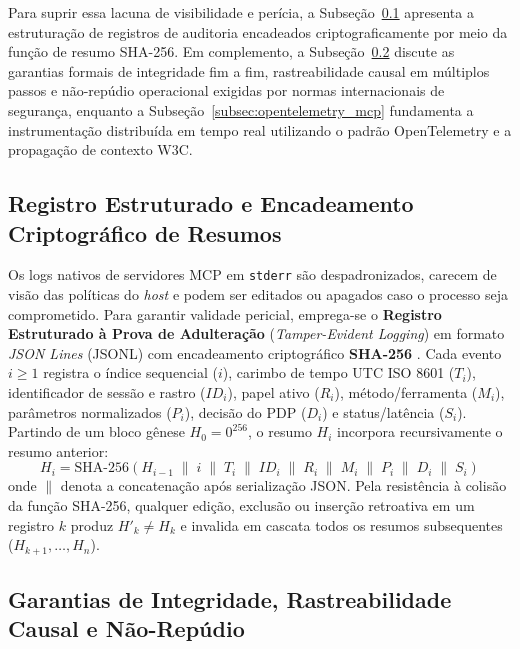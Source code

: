 Para suprir essa lacuna de visibilidade e perícia, a Subseção~\ref{subsec:hash_chaining} apresenta a estruturação de registros de auditoria encadeados criptograficamente por meio da função de resumo SHA-256. Em complemento, a Subseção~\ref{subsec:integridade_naorepudio} discute as garantias formais de integridade fim a fim, rastreabilidade causal em múltiplos passos e não-repúdio operacional exigidas por normas internacionais de segurança, enquanto a Subseção~\ref{subsec:opentelemetry_mcp} fundamenta a instrumentação distribuída em tempo real utilizando o padrão OpenTelemetry e a propagação de contexto W3C.

\subsection{Registro Estruturado e Encadeamento Criptográfico de Resumos}
\label{subsec:hash_chaining}

Os logs nativos de servidores MCP em \texttt{stderr} são despadronizados, carecem de visão das políticas do \textit{host} e podem ser editados ou apagados caso o processo seja comprometido. Para garantir validade pericial, emprega-se o \textbf{Registro Estruturado à Prova de Adulteração} (\textit{Tamper-Evident Logging}) em formato \textit{JSON Lines} (JSONL) com encadeamento criptográfico \textbf{SHA-256} \cite{jang2026hierarchical}. Cada evento $i \ge 1$ registra o índice sequencial ($i$), carimbo de tempo UTC ISO 8601 ($T_i$), identificador de sessão e rastro ($ID_i$), papel ativo ($R_i$), método/ferramenta ($M_i$), parâmetros normalizados ($P_i$), decisão do PDP ($D_i$) e status/latência ($S_i$). Partindo de um bloco gênese $H_0 = 0^{256}$, o resumo $H_i$ incorpora recursivamente o resumo anterior:
\begin{equation}
  H_i = \text{SHA-256}\left( H_{i-1} \;\|\; i \;\|\; T_i \;\|\; ID_i \;\|\; R_i \;\|\; M_i \;\|\; P_i \;\|\; D_i \;\|\; S_i \right)
  \label{eq:hash_chain}
\end{equation}
onde $\|$ denota a concatenação após serialização JSON. Pela resistência à colisão da função SHA-256, qualquer edição, exclusão ou inserção retroativa em um registro $k$ produz $H'_k \neq H_k$ e invalida em cascata todos os resumos subsequentes ($H_{k+1}, \dots, H_n$).

\subsection{Garantias de Integridade, Rastreabilidade Causal e Não-Repúdio}
\label{subsec:integridade_naorepudio}

